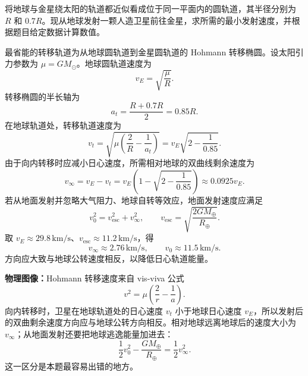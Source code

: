 \begin{question}[去金星的最小发射速度]
将地球与金星绕太阳的轨道都近似看成位于同一平面内的圆轨道，其半径分别为 $R$ 和 $0.7R$。现从地球发射一颗人造卫星前往金星，求所需的最小发射速度，并根据题目给定数据计算数值。

\begin{solution}
最省能的转移轨道为从地球圆轨道到金星圆轨道的 Hohmann 转移椭圆。设太阳引力参数为 $\mu=GM_\odot$。地球圆轨道速度为
\[
  v_E=\sqrt{\frac{\mu}{R}}.
\]
转移椭圆的半长轴为
\[
  a_t=\frac{R+0.7R}{2}=0.85R.
\]
在地球轨道处，转移轨道速度为
\[
  v_t=\sqrt{\mu\left(\frac{2}{R}-\frac{1}{a_t}\right)}
      =v_E\sqrt{2-\frac{1}{0.85}}.
\]
由于向内转移时应减小日心速度，所需相对地球的双曲线剩余速度为
\[
  v_\infty=v_E-v_t
  =v_E\left(1-\sqrt{2-\frac{1}{0.85}}\right)
  \approx 0.0925v_E .
\]
若从地面发射并忽略大气阻力、地球自转等效应，地面发射速度应满足
\[
  v_0^2=v_{\mathrm{esc}}^2+v_\infty^2,
  \qquad
  v_{\mathrm{esc}}=\sqrt{\frac{2GM_\oplus}{R_\oplus}}.
\]
取 $v_E\approx 29.8\,\mathrm{km/s}$、$v_{\mathrm{esc}}\approx 11.2\,\mathrm{km/s}$，得
\[
  v_\infty\approx 2.76\,\mathrm{km/s},
  \qquad
  \boxed{v_0\approx 11.5\,\mathrm{km/s}}.
\]
方向应大致与地球公转速度相反，以降低日心轨道能量。


\medskip
\textbf{物理图像：}Hohmann 转移速度来自 vis-viva 公式
\[
  v^2=\mu\left(\frac2r-\frac1a\right).
\]
向内转移时，卫星在地球轨道处的日心速度 $v_t$ 小于地球日心速度 $v_E$，所以发射后的双曲剩余速度方向应与地球公转方向相反。相对地球远离地球后的速度大小为 $v_\infty$；从地面发射还要把地球逃逸能量加进去：
\[
  \frac12v_0^2-\frac{GM_\oplus}{R_\oplus}=\frac12v_\infty^2.
\]
这一区分是本题最容易出错的地方。
\end{solution}
\end{question}

